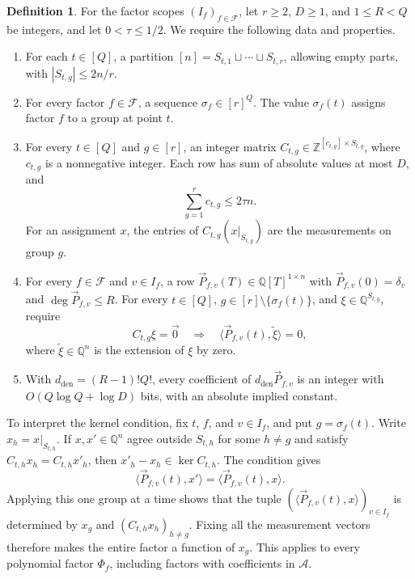 \documentclass[11pt,reqno]{amsart}
\numberwithin{equation}{section}
\theoremstyle{definition}\newtheorem{definition}[theorem]{Definition}
\theoremstyle{remark}\newtheorem{remark}[theorem]{Remark}
\renewcommand{\le}{\leqslant}
\renewcommand{\ge}{\geqslant}
\begin{document}
\begin{definition}\label{def:layout}
For the factor scopes $(I_f)_{f\in\mathcal F}$, let $r\ge2$, $D\ge1$,
and $1\le R<Q$ be integers, and let $0<\tau\le1/2$.
We require the following data and properties.
\begin{enumerate}
\item For each $t\in[Q]$, a partition
$[n]=S_{t,1}\sqcup\cdots\sqcup S_{t,r}$, allowing empty parts,
with $|S_{t,g}|\le2n/r$.
\item For every factor $f\in\mathcal F$, a sequence
$\sigma_f\in[r]^Q$. The value $\sigma_f(t)$ assigns factor $f$
to a group at point $t$.
\item For every $t\in[Q]$ and $g\in[r]$, an integer matrix
$C_{t,g}\in\mathbb Z^{[c_{t,g}]\times S_{t,g}}$, where
$c_{t,g}$ is a nonnegative integer. Each row has sum of absolute
values at most $D$, and
\[
 \sum_{g=1}^r c_{t,g}\le2\tau n.
\]
For an assignment $x$, the entries of
$C_{t,g}(x|_{S_{t,g}})$ are the measurements on group $g$.
\item For every $f\in\mathcal F$ and $v\in I_f$, a row
$\vec{P}_{f,v}(T)\in\mathbb Q[T]^{1\times n}$ with
$\vec{P}_{f,v}(0)=\delta_v$ and $\deg \vec{P}_{f,v}\le R$.
For every $t\in[Q]$, $g\in[r]\setminus\{\sigma_f(t)\}$, and
$\xi\in\mathbb Q^{S_{t,g}}$, require
\[
 C_{t,g}\xi=\vec{0}\quad\Longrightarrow\quad
 \langle \vec{P}_{f,v}(t), \widetilde\xi\rangle=0,
\]
where $\widetilde\xi\in\mathbb Q^n$ is the extension of $\xi$ by zero.
\item With $d_{\mathrm{den}}=(R-1)!Q!$, every coefficient of
$d_{\mathrm{den}} \vec{P}_{f,v}$ is an integer with
$O(Q\log Q+\log D)$ bits, with an absolute implied constant.
\end{enumerate}
\end{definition}

To interpret the kernel condition, fix $t$, $f$, and $v\in I_f$,
and put $g=\sigma_f(t)$. Write $x_h=x|_{S_{t,h}}$.
If $x,x'\in\mathbb Q^n$ agree outside $S_{t,h}$ for some $h\ne g$
and satisfy $C_{t,h}x_h=C_{t,h}x'_h$, then
$x'_h-x_h\in\ker C_{t,h}$. The condition gives
\[
 \langle \vec{P}_{f,v}(t), x'\rangle=\langle \vec{P}_{f,v}(t), x\rangle.
\]
Applying this one group at a time shows that the tuple
$(\langle \vec{P}_{f,v}(t), x\rangle)_{v\in I_f}$ is determined by $x_g$ and
$(C_{t,h}x_h)_{h\ne g}$. Fixing all the measurement vectors therefore
makes the entire factor a function of $x_g$. This applies to every
polynomial factor $\Phi_f$, including factors with coefficients in
$\mathcal A$.
\end{document}
